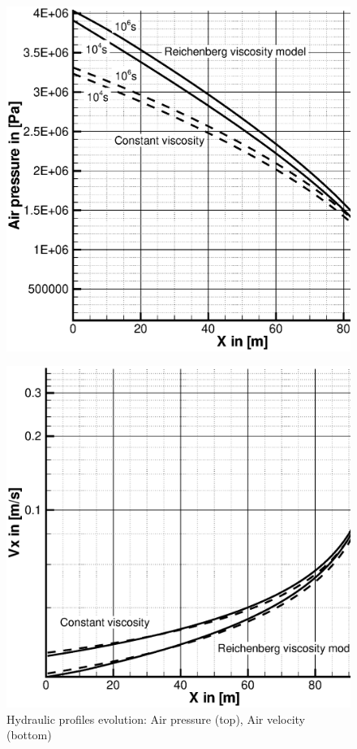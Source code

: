 \newpage
\begin{figure}[htb!]
\includegraphics[scale=0.4]{H_GAS/figures/press_ply.eps}
\end{figure}
\begin{figure}[htb!]
\includegraphics[scale=0.4]{H_GAS/figures/velo_ply.eps}
\caption{Hydraulic profiles evolution: Air pressure (top), Air velocity (bottom)}
\label{fig:air_flow}
\end{figure}

